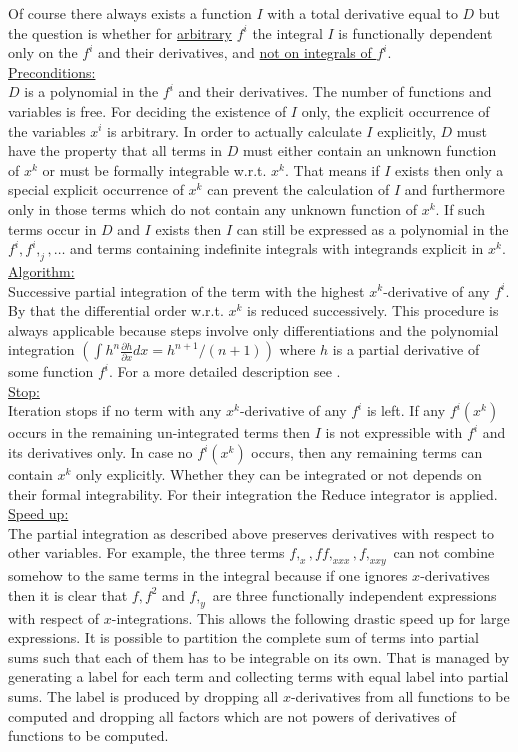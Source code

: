 \documentclass[12pt]{article}
\begin{document}
Of course there
always exists a function $I$ with a total derivative equal to $D$ but
the question is whether for \underline{arbitrary} $f^i$ the integral
$I$ is functionally dependent only on the $f^i$ and their derivatives,
and \underline{not on integrals of $f^i.$} \\
\underline{Preconditions:} \\
$D$ is a polynomial in the $f^i$ and their derivatives. The number of
functions and variables is free. 
For deciding the existence of $I$ only, the explicit occurrence of the
variables $x^i$ is arbitrary. In order to actually
calculate $I$ explicitly, $D$ must have the property that all terms in $D$ 
must either contain an unknown function of $x^k$ or
must be formally integrable w.r.t. $x^k.$
That means if $I$ exists then 
only a special explicit occurrence of $x^k$ can prevent the
calculation of $I$ 
and furthermore only in those terms which do not contain
any unknown function of $x^k.$ 
If such terms occur in $D$ and $I$ exists then $I$ can still be expressed
as a polynomial in the $f^i, f^i,_j, \ldots$ and terms containing 
indefinite integrals with integrands explicit in $x^k.$ \\
\underline{Algorithm:} \\
Successive partial integration of the term with the highest
$x^k$-derivative of any $f^i.$ By that the 
differential order w.r.t. $x^k$ is reduced
successively. This procedure is always applicable because steps involve only
differentiations and the polynomial
integration $(\int h^n\frac{\partial h}{\partial x}dx =
h^{n+1}/(n+1))$ where $h$ is a partial derivative of some function
$f^i.$ For a more detailed description see \cite{Wol99e}.\\
\underline{Stop:} \\
Iteration stops if no term with any $x^k$-derivative of any $f^i$ is left.
If any $f^i(x^k)$ occurs in the remaining un-integrated terms 
then $I$ is not expressible with $f^i$ and its derivatives only. In
case no $f^i(x^k)$ occurs, then any remaining terms can contain $x^k$ only
explicitly. Whether they can be integrated or not depends on their formal
integrability. For their integration the {\sc Reduce} integrator is
applied. \\
\underline{Speed up:} \\
The partial integration as described above preserves derivatives with
respect to other variables. For example, the three terms $f,_x, f
f,_{xxx}, f,_{xxy}$ can not combine somehow to the same terms in the
integral because if one ignores $x$-derivatives then it is clear that
$f, f^2$ and $f,_y$ are three functionally independent expressions
with respect of $x$-integrations. This allows the following drastic speed up
for large expressions. It is possible to partition the complete sum of
terms into partial sums such that each of them has to be
integrable on its own. That is managed by generating a label for each
term and collecting terms with equal label into partial sums. The
label is produced by dropping all $x$-derivatives from all functions
to be computed and dropping all factors which are not powers of derivatives of
functions to be computed.
\end{document}
